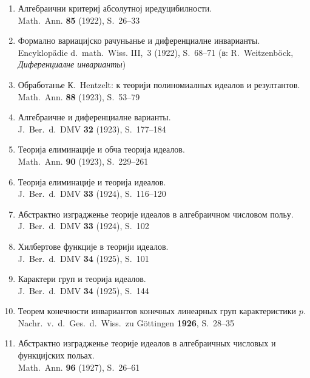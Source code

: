 ﻿\documentclass[11pt]{article}
\newcommand{\foreign}[1]{#1}
\begin{document}
\begin{enumerate}[label={\small\arabic*.},leftmargin=2em,itemsep=0.3em]
\item Алгебраични критериј абсолутној иредуцибилности.\\
\foreign{Math.\ Ann.} \textbf{85} (1922), S.~26--33

\item Формално вариацијско рачуньанье и диференциалне инварианты.\\
\foreign{Encyklopädie d.\ math.\ Wiss.} III,\ 3 (1922), S.~68--71 (в:
R.\ Weitzenböck, \textit{Диференциалне инварианты})

\item Обработанье К.\ Hentzelt: к теорији полиномиалных идеалов и резултантов.\\
\foreign{Math.\ Ann.} \textbf{88} (1923), S.~53--79

\item Алгебраичне и диференциалне варианты.\\
\foreign{J.\ Ber.\ d.\ DMV} \textbf{32} (1923), S.~177--184

\item Теорија елиминације и обча теорија идеалов.\\
\foreign{Math.\ Ann.} \textbf{90} (1923), S.~229--261

\item Теорија елиминације и теорија идеалов.\\
\foreign{J.\ Ber.\ d.\ DMV} \textbf{33} (1924), S.~116--120

\item Абстрактно изградженье теорије идеалов в алгебраичном числовом польу.\\
\foreign{J.\ Ber.\ d.\ DMV} \textbf{33} (1924), S.~102

\item Хилбертове функције в теорији идеалов.\\
\foreign{J.\ Ber.\ d.\ DMV} \textbf{34} (1925), S.~101

\item Карактери груп и теорија идеалов.\\
\foreign{J.\ Ber.\ d.\ DMV} \textbf{34} (1925), S.~144

\item Теорем конечности инвариантов конечных линеарных груп карактеристики $p$.\\
\foreign{Nachr.\ v.\ d.\ Ges.\ d.\ Wiss.\ zu Göttingen} \textbf{1926}, S.~28--35

\item Абстрактно изградженье теорије идеалов в алгебраичных числовых и функцијских польах.\\
\foreign{Math.\ Ann.} \textbf{96} (1927), S.~26--61


\end{enumerate}
\end{document}
